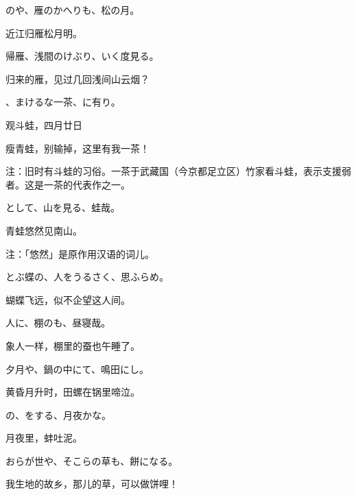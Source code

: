 \begin{haiku}
    {\FH {}のや、雁のかへりも、松の月。}

    {\FK 近江归雁松月明。}
\end{haiku}

\begin{haiku}
    {\FH 帰雁、浅間のけぶり、いく度見る。}

    {\FK 归来的雁，见过几回浅间山云烟？}
\end{haiku}

\begin{haiku}
    {\FH {}、まけるな一茶、に有り。}

    {\FK 观斗蛙，四月廿日}

    {\FK 瘦青蛙，别输掉，这里有我一茶！}

    {\FT 注：旧时有斗蛙的习俗。一茶于武藏国（今京都足立区）竹家看斗蛙，表示支援弱者。这是一茶的代表作之一。}
\end{haiku}

\begin{haiku}
    {\FH {}として、山を見る、蛙哉。}

    {\FK 青蛙悠然见南山。}

    {\FT 注：「悠然」是原作用汉语的词儿。}
\end{haiku}

\begin{haiku}
    {\FH とぶ蝶の、人をうるさく、思ふらめ。}

    {\FK 蝴蝶飞远，似不企望这人间。}
\end{haiku}

\begin{haiku}
    {\FH 人に、棚のも、昼寝哉。}

    {\FK 象人一样，棚里的蚕也午睡了。}
\end{haiku}

\begin{haiku}
    {\FH 夕月や、鍋の中にて、鳴田にし。}

    {\FK 黄昏月升时，田螺在锅里啼泣。}
\end{haiku}

\begin{haiku}
    {\FH {}の、をする、月夜かな。}

    {\FK 月夜里，蚌吐泥。}
\end{haiku}

\begin{haiku}
    {\FH おらが世や、そこらの草も、餅になる。}

    {\FK 我生地的故乡，那儿的草，可以做饼哩！}
\end{haiku}

